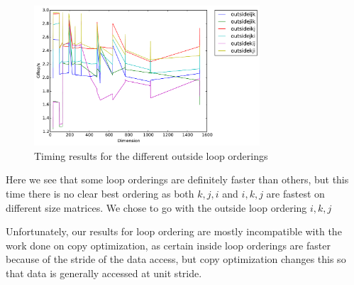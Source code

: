\begin{figure}[hh]
\includegraphics[width=0.75\textwidth]{timing_outsideloops.pdf}
\caption{Timing results for the different outside loop orderings}
\end{figure}

Here we see that some loop orderings are definitely faster than others, but
this time there is no clear best ordering as both $k,j,i$ and $i,k,j$ are
fastest on different size matrices. We chose to go with the outside loop
ordering $i,k,j$

Unfortunately, our results for loop ordering are mostly incompatible with the
work done on copy optimization, as certain inside loop orderings are faster
because of the stride of the data access, but copy optimization changes this so
that data is generally accessed at unit stride.
